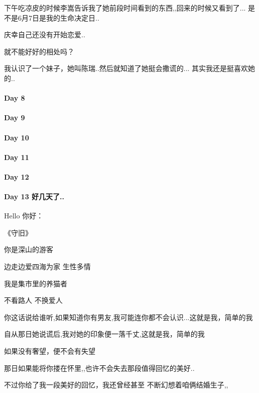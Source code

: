 \documentclass[UTF8,a4paper,8pt]{ctexbook}
\begin{document}
	 	 下午吃凉皮的时候李嵩告诉我了她前段时间看到的东西,,回来的时候又看到了... 是不是6月7日是我的生命决定日..
	 	 
	 	 庆幸自己还没有开始恋爱..
	 	 
	 	 就不能好好的相处吗？
	 	 
	 	 我认识了一个妹子，她叫陈瑞..然后就知道了她挺会撒谎的... 其实我还是挺喜欢她的..
	 	 
 	 \paragraph{Day 8       \quad     }
 	 \paragraph{Day 9       \quad     }
 	 \paragraph{Day 10      \quad     }
 	 \paragraph{Day 11      \quad     }
 	 \paragraph{Day 12      \quad     }
 	 \paragraph{Day 13  好几天了..    \quad     }
	 	 Hello 你好：
	 	 
	 	 《守旧》
	 	 
	 	 你是深山的游客
	 	 
	 	 边走边爱四海为家 \hspace{1cm} 生性多情
	 	 
	 	 我是集市里的养猫者 
	 	 
	 	 不看路人  \hspace{1cm}  不换爱人
	 	 
	 	 你这话说给谁听,如果知道你有男友,我可能连你都不会认识...这就是我，简单的我
	 	 
	 	 自从那日她说谎后,我对她的印象便一落千丈,这就是我，简单的我
	 	 
	 	 如果没有奢望，便不会有失望
	 	 
	 	 那日如果能将你搂在怀里,,也许不会失去那段值得回忆的美好..
	 	 
	 	 不过你给了我一段美好的回忆，我还曾经甚至 不断幻想着咱俩结婚生子,,
	 	 
\end{document}
